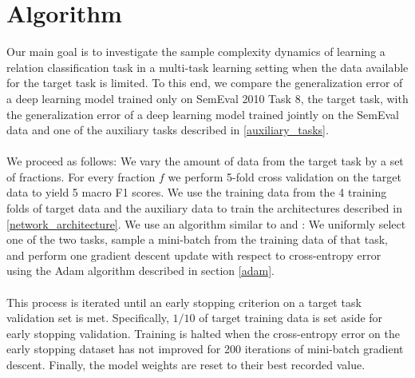 \section{Algorithm}

Our main goal is to investigate the sample complexity dynamics of learning a relation classification task in a multi-task learning setting when the data available for the target task is limited. To this end, we compare the generalization error of a deep learning model trained only on SemEval 2010 Task 8, the target task, with the generalization error of a deep learning model trained jointly on the SemEval data and one of the auxiliary tasks described in \ref{auxiliary_tasks}.
\\\\
We proceed as follows: We vary the amount of data from the target task by a set of fractions. For every fraction $f$ we perform 5-fold cross validation on the target data to yield 5 macro F1 scores. We use the training data from the 4 training folds of target data and the auxiliary data to train the architectures described in \ref{network_architecture}. We use an algorithm similar to \citet{mou2016} and \citet{bingel2017}: We uniformly select one of the two tasks, sample a mini-batch from the training data of that task, and perform one gradient descent update with respect to cross-entropy error using the Adam algorithm described in section \ref{adam}.
\\\\
This process is iterated until an early stopping criterion on a target task validation set is met. Specifically, $1/10$ of target training data is set aside for early stopping validation. Training is halted when the cross-entropy error on the early stopping dataset has not improved for 200 iterations of mini-batch gradient descent. Finally, the model weights are reset to their best recorded value.

